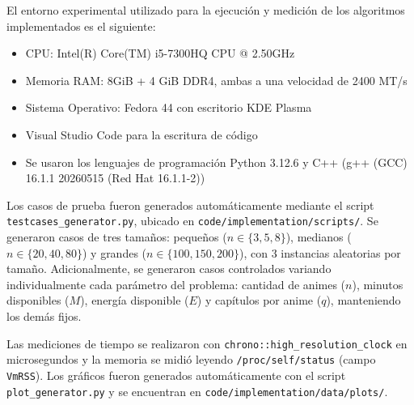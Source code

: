 El entorno experimental utilizado para la ejecución y medición de los algoritmos implementados es el siguiente:

\begin{itemize}
    \item CPU: Intel(R) Core(TM) i5-7300HQ CPU @ 2.50GHz
    \item Memoria RAM: 8GiB + 4 GiB DDR4, ambas a una velocidad de 2400 MT/s
    \item Sistema Operativo: Fedora 44 con escritorio KDE Plasma
    \item Visual Studio Code para la escritura de código
    \item Se usaron los lenguajes de programación Python 3.12.6 y C++ (g++ (GCC) 16.1.1 20260515 (Red Hat 16.1.1-2))
\end{itemize}

Los casos de prueba fueron generados automáticamente mediante el script \texttt{testcases\_generator.py}, ubicado en \texttt{code/implementation/scripts/}. Se generaron casos de tres tamaños: pequeños ($n \in \{3, 5, 8\}$), medianos ($n \in \{20, 40, 80\}$) y grandes ($n \in \{100, 150, 200\}$), con 3 instancias aleatorias por tamaño. Adicionalmente, se generaron casos controlados variando individualmente cada parámetro del problema: cantidad de animes ($n$), minutos disponibles ($M$), energía disponible ($E$) y capítulos por anime ($q$), manteniendo los demás fijos.

Las mediciones de tiempo se realizaron con \texttt{chrono::high\_resolution\_clock} en microsegundos y la memoria se midió leyendo \texttt{/proc/self/status} (campo \texttt{VmRSS}). Los gráficos fueron generados automáticamente con el script \texttt{plot\_generator.py} y se encuentran en \texttt{code/implementation/data/plots/}.